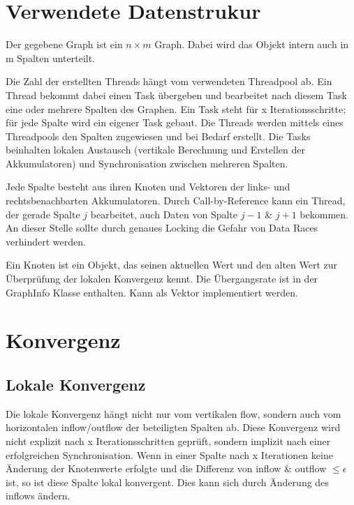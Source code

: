\section{Verwendete Datenstrukur}
Der gegebene Graph ist ein $n\times m$ Graph. Dabei wird das Objekt intern auch in m Spalten unterteilt. 

Die Zahl der erstellten Threads hängt vom verwendeten Threadpool ab. Ein Thread bekommt dabei einen Task übergeben und bearbeitet nach diesem Task eine oder mehrere Spalten des Graphen. Ein Task steht für x Iterationsschritte; für jede Spalte wird ein eigener Task gebaut. Die Threads werden mittels eines Threadpools den Spalten zugewiesen und bei Bedarf erstellt. Die Tasks beinhalten lokalen Austausch (vertikale Berechnung und Erstellen der Akkumulatoren) und Synchronisation zwischen mehreren Spalten.

Jede Spalte besteht aus ihren Knoten und Vektoren der links- und rechtsbenachbarten Akkumulatoren. Durch Call-by-Reference kann ein Thread, der gerade Spalte $j$ bearbeitet, auch Daten von Spalte $j-1$ \& $j+1$ bekommen. An dieser Stelle sollte durch genaues Locking die Gefahr von Data Races verhindert werden. 

Ein Knoten ist ein Objekt, das seinen aktuellen Wert und den alten Wert zur Überprüfung der lokalen Konvergenz kennt. Die Übergangsrate ist in der GraphInfo Klasse enthalten. Kann als Vektor implementiert werden.

\section{Konvergenz}
\subsection{Lokale Konvergenz}
\label{lk}
Die lokale Konvergenz hängt nicht nur vom vertikalen flow, sondern auch vom horizontalen inflow/outflow der beteiligten Spalten ab. Diese Konvergenz wird nicht explizit nach x Iterationsschritten geprüft, sondern implizit nach einer erfolgreichen Synchronisation. Wenn in einer Spalte nach x Iterationen keine Änderung der Knotenwerte erfolgte und die Differenz von inflow \& outflow  $ \leq \epsilon$ ist, so ist diese Spalte lokal konvergent.  Dies kann sich durch Änderung des inflows ändern. 

